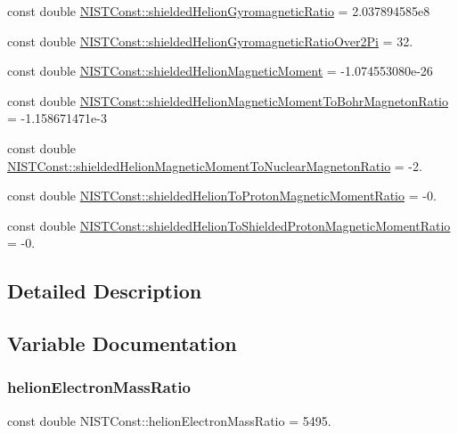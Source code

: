 \begin{DoxyCompactItemize}
\item 
const double \hyperlink{group___helion_gaf3b7dabd6de7a263aba710256e793c8e}{N\+I\+S\+T\+Const\+::shielded\+Helion\+Gyromagnetic\+Ratio} = 2.\+037894585e8
\item 
const double \hyperlink{group___helion_gaed43f2ab9c5e89c6dda577a3b5fc265c}{N\+I\+S\+T\+Const\+::shielded\+Helion\+Gyromagnetic\+Ratio\+Over2\+Pi} = 32.
\item 
const double \hyperlink{group___helion_ga1b0f92c14390afe726af4005e21c2ae8}{N\+I\+S\+T\+Const\+::shielded\+Helion\+Magnetic\+Moment} = -\/1.\+074553080e-\/26
\item 
const double \hyperlink{group___helion_gac48304d45406c207fbadeca604d5c71a}{N\+I\+S\+T\+Const\+::shielded\+Helion\+Magnetic\+Moment\+To\+Bohr\+Magneton\+Ratio} = -\/1.\+158671471e-\/3
\item 
const double \hyperlink{group___helion_gae3bf1eccb33e00a6da688959fd99bbb3}{N\+I\+S\+T\+Const\+::shielded\+Helion\+Magnetic\+Moment\+To\+Nuclear\+Magneton\+Ratio} = -\/2.
\item 
const double \hyperlink{group___helion_ga9aa0ad55bc28f6402fcd872f9435547e}{N\+I\+S\+T\+Const\+::shielded\+Helion\+To\+Proton\+Magnetic\+Moment\+Ratio} = -\/0.
\item 
const double \hyperlink{group___helion_ga3b8301672e9de426ef6bf13276b42acc}{N\+I\+S\+T\+Const\+::shielded\+Helion\+To\+Shielded\+Proton\+Magnetic\+Moment\+Ratio} = -\/0.
\end{DoxyCompactItemize}


\subsection{Detailed Description}


\subsection{Variable Documentation}
\mbox{\label{group___helion_ga5c779784a4f223f0936cb067e2674474}} 
\subsubsection{\texorpdfstring{helion\+Electron\+Mass\+Ratio}{helionElectronMassRatio}}
{\footnotesize\ttfamily const double N\+I\+S\+T\+Const\+::helion\+Electron\+Mass\+Ratio = 5495.}


